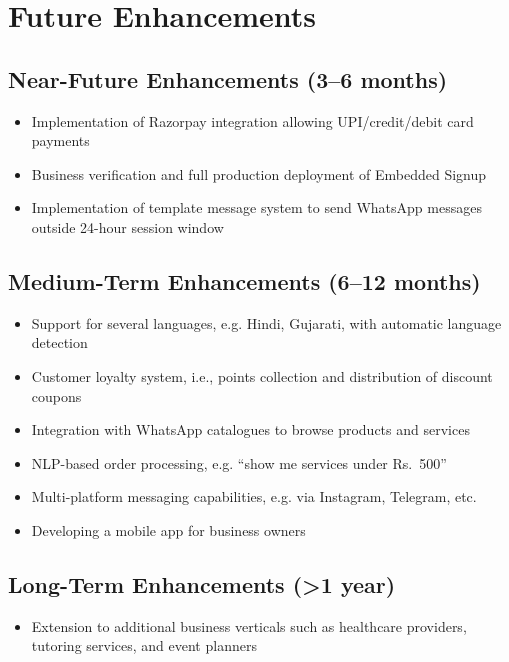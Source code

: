 \section{Future Enhancements}

\subsection{Near-Future Enhancements (3--6 months)}

\begin{itemize}
    \item Implementation of Razorpay integration allowing UPI/credit/debit card payments
    \item Business verification and full production deployment of Embedded Signup
    \item Implementation of template message system to send WhatsApp messages outside 24-hour session window
\end{itemize}

\subsection{Medium-Term Enhancements (6--12 months)}

\begin{itemize}
    \item Support for several languages, e.g. Hindi, Gujarati, with automatic language detection
    \item Customer loyalty system, i.e., points collection and distribution of discount coupons
    \item Integration with WhatsApp catalogues to browse products and services
    \item NLP-based order processing, e.g. ``show me services under Rs.\ 500''
    \item Multi-platform messaging capabilities, e.g. via Instagram, Telegram, etc.
    \item Developing a mobile app for business owners
\end{itemize}

\subsection{Long-Term Enhancements (>1 year)}

\begin{itemize}
    \item Extension to additional business verticals such as healthcare providers, tutoring services, and event planners
\end{itemize}